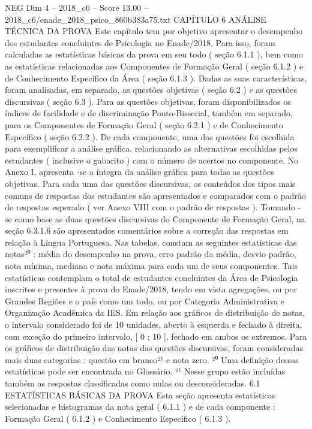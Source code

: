 \begin{textsample}{NEG Dim 4 – 2018\_c6 – Score 13.00 – 2018\_c6/enade\_2018\_psico\_860b383a75.txt}  \label{ex:f4_neg_348}
CAPÍTULO 6 ANÁLISE TÉCNICA DA PROVA Este capítulo tem por objetivo apresentar o desempenho dos estudantes concluintes de Psicologia no Enade/2018.
Para isso, foram calculadas as estatísticas básicas da prova em seu todo ( seção 6.1.1 ), bem como as estatísticas relacionadas aos Componentes de Formação Geral ( seção 6.1.2 ) e de Conhecimento Específico da Área ( seção 6.1.3 ).
Dadas as suas características, foram analisadas, em separado, as questões objetivas ( seção 6.2 ) e as questões discursivas ( seção 6.3 ).
Para as questões objetivas, foram disponibilizados os índices de facilidade e de discriminação Ponto-Bisserial, também em separado, para os Componentes de Formação Geral ( seção 6.2.1 ) e de Conhecimento Específico ( seção 6.2.2 ).
De cada componente, uma das questões foi escolhida para exemplificar a análise gráfica, relacionando as alternativas escolhidas pelos estudantes ( inclusive o gabarito ) com o número de acertos no componente.
No Anexo I, apresenta -se a íntegra da análise gráfica para todas as questões objetivas.
Para cada uma das questões discursivas, os conteúdos dos tipos mais comuns de respostas dos estudantes são apresentados e comparados com o padrão de respostas esperado ( ver Anexo VIII com o padrão de respostas ).
Tomando -se como base as duas questões discursivas do Componente de Formação Geral, na seção 6.3.1.6 são apresentados comentários sobre a correção das respostas em relação à Língua Portuguesa.
Nas tabelas, constam as seguintes estatísticas das notas²⁰ : média do desempenho na prova, erro padrão da média, desvio padrão, nota mínima, mediana e nota máxima para cada um de seus componentes.
Tais estatísticas contemplam o total de estudantes concluintes da Área de Psicologia inscritos e presentes à prova do Enade/2018, tendo em vista agregações, ou por Grandes Regiões e o país como um todo, ou por Categoria Administrativa e Organização Acadêmica da IES.
Em relação aos gráficos de distribuição de notas, o intervalo considerado foi de 10 unidades, aberto à esquerda e fechado à direita, com exceção do primeiro intervalo, [ 0 ; 10 ], fechado em ambos os extremos.
Para os gráficos de distribuição das notas das questões discursivas, foram consideradas mais duas categorias : questão em branco²¹ e nota zero. ²⁰ Uma definição dessas estatísticas pode ser encontrada no Glossário. ²¹ Nesse grupo estão incluídas também as respostas classificadas como nulas ou desconsideradas. 6.1 ESTATÍSTICAS BÁSICAS DA PROVA Esta seção apresenta estatísticas selecionadas e histogramas da nota geral ( 6.1.1 ) e de cada componente : Formação Geral ( 6.1.2 ) e Conhecimento Específico ( 6.1.3 ).

\end{textsample}
